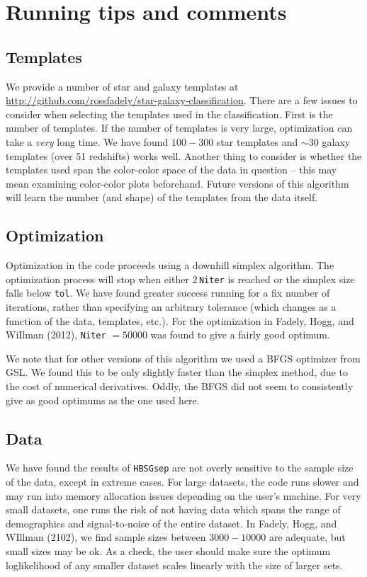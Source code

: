 \documentclass[12pt,preprint]{aastex}
\begin{document}
\section{Running tips and comments}

\subsection{Templates}

We provide a number of star and galaxy templates at 
\href{http://github.com/rossfadely/star-galaxy-classification}
{http://github.com/rossfadely/star-galaxy-classification}.  There are a few issues to 
consider when selecting the templates used in the classification.  First is the number 
of templates.  If the number of templates is very large, optimization can take a 
\emph{very} long time.  We have found $100-300$ star templates and $\sim 30$ 
galaxy templates (over 51 redshifts) works well.  Another thing to consider is whether 
the templates used span the color-color space of the data in question -- this may 
mean examining color-color plots beforehand.   Future versions of this algorithm will 
learn the number (and shape) of the templates from the data itself.

\subsection{Optimization}

Optimization in the code proceeds using a downhill simplex algorithm.  The optimization 
process will stop when either 2\,{\tt Niter} is reached or the simplex size falls below {\tt tol}.  
We have found greater success running for a fix number of iterations, rather than 
specifying an arbitrary tolerance (which changes as a function of the data, templates, etc.).  
For the optimization in Fadely, Hogg, and WiIlman (2012), {\tt Niter} $=50000$ was found 
to give a fairly good optimum.  

We note that for other versions of this algorithm we used a BFGS optimizer from GSL.  We 
found this to be only slightly faster than the simplex method, due to the cost of numerical 
derivatives.  Oddly, the BFGS did not seem to consistently give as good optimums as the 
one used here.

\subsection{Data}

We have found the results of {\tt HBSGsep} are not overly sensitive to the sample size 
of the data, except in extreme cases.  For large datasets, the code runs slower and may 
run into memory allocation issues depending on the user's machine.  For very small 
datasets, one runs the risk of not having data which spans the range of demographics 
and signal-to-noise of the entire dataset.  In Fadely, Hogg, and WIllman (2102), we find 
sample sizes between $3000-10000$ are adequate, but small sizes may be ok.  As a 
check, the user should make sure the optimum loglikelihood of any smaller dataset 
scales linearly with the size of larger sets.
\end{document}
